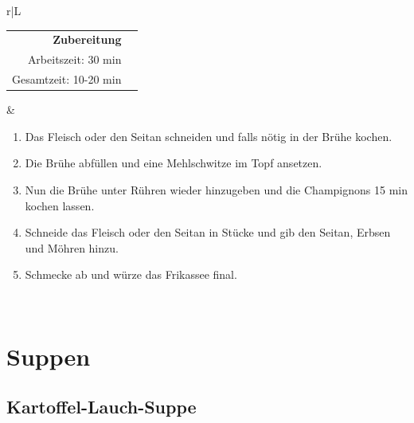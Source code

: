 \documentclass[a4paper, 12pt]{scrbook} 								%
\numberwithin{equation}{section} 									%
\begin{document}
	\newpage
	\begin{tabularx}{\textwidth}{r|L}

		\begin{tabular}[t]{rr}
			\textbf{Zubereitung}	\\
			Arbeitszeit: 30 min	\\
			Gesamtzeit:	10-20 min	\\
		\end{tabular}			&	\begin{enumerate}[nosep]
										\item Das Fleisch oder den Seitan schneiden und falls nötig in der Brühe kochen. 
										\item Die Brühe abfüllen und eine Mehlschwitze im Topf ansetzen.
										\item Nun die Brühe unter Rühren wieder hinzugeben und die Champignons 15 min kochen lassen.
										\item Schneide das Fleisch oder den Seitan in Stücke und gib den Seitan, Erbsen und Möhren hinzu.
										\item Schmecke ab und würze das Frikassee final.
									\end{enumerate}	\\
	\end{tabularx}
	\newpage


	\section{Suppen}
	\newpage


		\subsection{Kartoffel-Lauch-Suppe}
\end{document}
